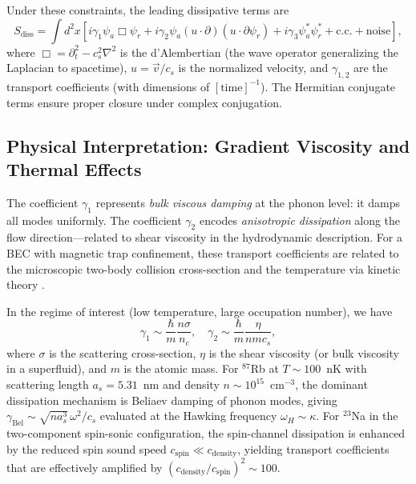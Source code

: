 \documentclass[aps,prl,twocolumn,superscriptaddress,nofootinbib,amsmath,amssymb]{revtex4-2}
\begin{document}
Under these constraints, the leading dissipative terms are
\begin{equation}
\label{eq:dissipative_action}
S_{\text{diss}} = \int d^2 x \left[ i\gamma_1 \psi_a \Box \psi_r + i\gamma_2 \psi_a (u \cdot \partial)(u \cdot \partial \psi_r) + i\gamma_3 \psi_a^* \psi_r^* + \text{c.c.} + \text{noise} \right],
\end{equation}
where $\Box = \partial_t^2 - c_s^2 \nabla^2$ is the d'Alembertian (the wave operator generalizing the Laplacian to spacetime), $u = \vec{v}/c_s$ is the normalized velocity, and $\gamma_{1,2}$ are the transport coefficients (with dimensions of $[\text{time}]^{-1}$). The Hermitian conjugate terms ensure proper closure under complex conjugation.

\subsection{Physical Interpretation: Gradient Viscosity and Thermal Effects}

The coefficient $\gamma_1$ represents \textit{bulk viscous damping} at the phonon level: it damps all modes uniformly. The coefficient $\gamma_2$ encodes \textit{anisotropic dissipation} along the flow direction---related to shear viscosity in the hydrodynamic description. For a BEC with magnetic trap confinement, these transport coefficients are related to the microscopic two-body collision cross-section and the temperature via kinetic theory \cite{Zaremba1999}.

In the regime of interest (low temperature, large occupation number), we have
\begin{equation}
\label{eq:gamma_estimates}
\gamma_1 \sim \frac{\hbar}{m} \frac{n \sigma}{n_c}, \quad \gamma_2 \sim \frac{\hbar}{m} \frac{\eta}{n m c_s},
\end{equation}
where $\sigma$ is the scattering cross-section, $\eta$ is the shear viscosity (or bulk viscosity in a superfluid), and $m$ is the atomic mass. For $^{87}$Rb at $T \sim 100$~nK with scattering length $a_s = 5.31$~nm and density $n \sim 10^{15}$~cm$^{-3}$, the dominant dissipation mechanism is Beliaev damping of phonon modes, giving $\gamma_{\text{Bel}} \sim \sqrt{na_s^3}\,\omega^2/c_s$ evaluated at the Hawking frequency $\omega_H \sim \kappa$. For $^{23}$Na in the two-component spin-sonic configuration, the spin-channel dissipation is enhanced by the reduced spin sound speed $c_{\text{spin}} \ll c_{\text{density}}$, yielding transport coefficients that are effectively amplified by $(c_{\text{density}}/c_{\text{spin}})^2 \sim 100$.
\end{document}
